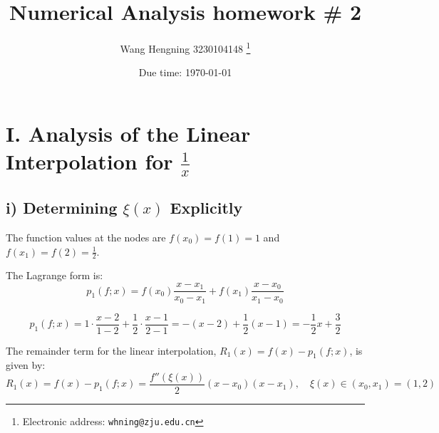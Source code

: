 \documentclass[a4paper]{article}
\begin{document}
\title{Numerical Analysis homework \# 2}
\author{Wang Hengning 3230104148
  \thanks{Electronic address: \texttt{whning@zju.edu.cn}}}


\date{Due time: \today}

\maketitle




\section*{I. Analysis of the Linear Interpolation for $\frac{1}{x}$}

\subsection*{i) Determining $\xi(x)$ Explicitly}

The function values at the nodes are $f(x_0) = f(1) = 1$ and $f(x_1) = f(2) = \frac{1}{2}$.

The Lagrange form is:
\[
p_1(f; x) = f(x_0)\frac{x-x_1}{x_0-x_1} + f(x_1)\frac{x-x_0}{x_1-x_0}
\]

\[
p_1(f; x) = 1 \cdot \frac{x-2}{1-2} + \frac{1}{2} \cdot \frac{x-1}{2-1} = -(x-2) + \frac{1}{2}(x-1) = -\frac{1}{2}x + \frac{3}{2}
\]

The remainder term for the linear interpolation, $R_1(x) = f(x) - p_1(f; x)$, is given by:
\[
R_1(x) = f(x) - p_1(f; x) = \frac{f''(\xi(x))}{2}(x - x_0)(x - x_1), \quad \xi(x) \in (x_0, x_1) = (1, 2)
\]
\end{document}
